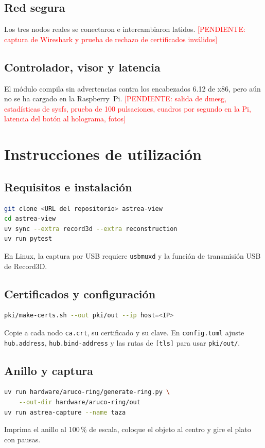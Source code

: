 \documentclass[journal]{IEEEtran}
\newcommand{\pendiente}[1]{\textcolor{red}{[PENDIENTE: #1]}}
\begin{document}
\subsection{Red segura}
Los tres nodos reales se conectaron e intercambiaron latidos.
\pendiente{captura de Wireshark y prueba de rechazo de certificados inválidos}

\subsection{Controlador, visor y latencia}
El módulo compila sin advertencias contra los encabezados 6.12 de x86, pero aún
no se ha cargado en la Raspberry~Pi.
\pendiente{salida de dmesg, estadísticas de sysfs, prueba de 100 pulsaciones,
cuadros por segundo en la Pi, latencia del botón al holograma, fotos}

\section{Instrucciones de utilización}

\subsection{Requisitos e instalación}
\begin{lstlisting}[language=bash]
git clone <URL del repositorio> astrea-view
cd astrea-view
uv sync --extra record3d --extra reconstruction
uv run pytest
\end{lstlisting}

En Linux, la captura por USB requiere \texttt{usbmuxd} y la función de
transmisión USB de Record3D.

\subsection{Certificados y configuración}
\begin{lstlisting}[language=bash]
pki/make-certs.sh --out pki/out --ip host=<IP>
\end{lstlisting}
Copie a cada nodo \texttt{ca.crt}, su certificado y su clave. En
\texttt{config.toml} ajuste \texttt{hub.address}, \texttt{hub.bind-address} y las
rutas de \texttt{[tls]} para usar \texttt{pki/out/}.

\subsection{Anillo y captura}
\begin{lstlisting}[language=bash]
uv run hardware/aruco-ring/generate-ring.py \
    --out-dir hardware/aruco-ring/out
uv run astrea-capture --name taza
\end{lstlisting}
Imprima el anillo al 100\,\% de escala, coloque el objeto al centro y gire el
plato con pausas.
\end{document}
